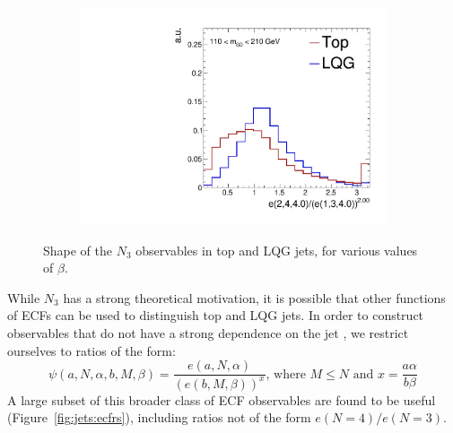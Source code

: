 \begin{figure}[]
\begin{center}
\begin{subfigure}[t]{0.32\textwidth}
            \includegraphics[width=\textwidth]{figures/toptagging/shapes/mass_ratio_24401340.pdf}
        \end{subfigure}
        \caption{Shape of the $N_3$ observables in top and LQG jets, for various values of $\beta$.}
        \label{fig:jets:n3}
    \end{center}
\end{figure}

While $N_3$ has a strong theoretical motivation, it is possible that other functions of ECFs can be used to distinguish top and LQG jets.
In order to construct observables that do not have a strong dependence on the jet \pt, we restrict ourselves to ratios of the form:
\begin{equation}
    \psi(a,N,\alpha,b,M,\beta) = 
    \frac{e(a,N,\alpha)}{\left(e(b,M,\beta)\right)^x} 
    \text{, where } M\leq N \text{ and } x = \frac{a\alpha}{b\beta}
\end{equation}
A large subset of this broader class of ECF observables are found to be useful (Figure~\ref{fig:jets:ecfrs}), including ratios not of the form $e(N=4)/e(N=3)$.

